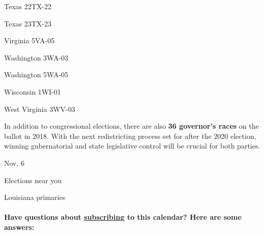 Texas 22TX-22

Texas 23TX-23

Virginia 5VA-05

Washington 3WA-03

Washington 5WA-05

Wisconsin 1WI-01

West Virginia 3WV-03

In addition to congressional elections, there are also \textbf{36
governor's races} on the ballot in 2018. With the next redistricting
process set for after the 2020 election, winning gubernatorial and state
legislative control will be crucial for both parties.

Nov. 6

Elections near you

Louisiana primaries

\hypertarget{have-questions-about-subscribing-to-this-calendar-here-are-some-answers}{%
\paragraph{\texorpdfstring{Have questions about
\protect\hyperlink{promo-button-holder}{subscribing} to this calendar?
Here are some
answers:}{Have questions about subscribing to this calendar? Here are some answers:}}\label{have-questions-about-subscribing-to-this-calendar-here-are-some-answers}}

